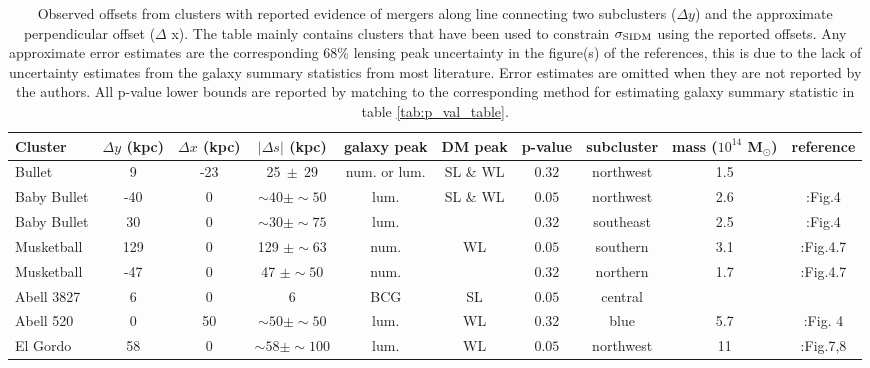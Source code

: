 \begin{table*}
	\small
	\centering
	 \caption{Observed offsets from clusters with reported evidence of mergers
		 along line connecting two subclusters ($\Delta y$) and the approximate 
		 perpendicular offset ($\Delta$ x).
		 The table mainly contains clusters that have been used to constrain
		 $\sigma_{\rm SIDM}$ using the reported offsets.
	 Any approximate  
	 error estimates are the corresponding 68\% lensing peak uncertainty
	 in the figure(s) of the references, this is due to the lack of uncertainty
	 estimates from the galaxy summary statistics from most literature. 
		Error estimates are omitted when they are not reported by the authors.  
	 All p-value lower bounds are reported by matching to the corresponding method for
	 estimating galaxy summary statistic in table \ref{tab:p_val_table}.
	 \label{tab:offset_results}} 
	 \begin{tabular}{@{}lccccccccc@{}}
	 \hline 
	 Cluster &$\Delta y$ (kpc) & $\Delta x$ (kpc) & $|\Delta s|$ (kpc) & galaxy peak & DM peak &  p-value & subcluster &
	 mass ($10^{14}$ M$_\odot$)  &  reference\\
	 \hline
	 Bullet  & 9  & -23 & 25$~\pm~29$ & num. or lum. & SL \& WL & $0.32$ &
	 northwest & 1.5 & \citealt{Randall2008d}\\
	 Baby Bullet & -40&  0 & $\sim 40 \pm \sim 50 $  & lum. & SL \& WL &
	 $ 0.05 $ & northwest & 2.6 &
	 \citealt{Bradac2008}:Fig.4 \\
	 Baby Bullet & 30  & 0 & $\sim 30 \pm \sim 75 $ & lum. & & $
	 0.32 $&
	 southeast
	  & 2.5 & \citealt{Bradac2008}:Fig.4 \\
	 Musketball &  129 & 0 & 129 $\pm \sim63$ & num. & WL & $0.05$ &
	southern & 3.1 
	 & \citealt{Dawson2013}:Fig.4.7\\
	 Musketball & -47 & 0 & 47 $\pm \sim50$ & num. & & $0.32$ &
	 northern & 1.7 &  
	  \citealt{Dawson2013}:Fig.4.7\\
		Abell 3827 & 6 & 0 & 6 & BCG & SL & $0.05$ & central & & \citealt{Williams2011a}\\ 
		Abell 520 & 0 & 50& $\sim50 \pm \sim50$ & lum. & WL & $0.32$ & blue 
		 & 5.7 & \citealt{Clowe2012}:Fig. 4 \\
		El Gordo &  58 &0 & $\sim58 \pm \sim100$ & lum. & WL & $0.05$ & 
		northwest& 11  &\citealt{Jee2014}:Fig.7,8  \\

\end{tabular}
\end{table*}
